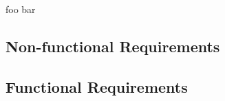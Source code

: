 foo bar

\subsection{\label{sec::Non-functionalRequirements}Non-functional Requirements}

\subsection{\label{sec::FunctionalRequirements}Functional Requirements}

